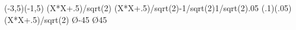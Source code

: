 \documentclass{jarticle}
\begin{document}
\begin{zahyou}[ul=10mm](-3,5)(-1,5)
  \zahyouMemori[g]%
  \def\Fx{(X*X+.5)/sqrt(2)}
  \YKinziOresen\Fx\xmin{}\oresen
  \YKinziOresen\Fx{-1/sqrt(2)}{1/sqrt(2)}{.05}\nurisen
  \edefappend{}
  \YGurafu(.1)(.05)\Fx\xmin\xmax
  \kTyokusen\O{-45}{}{}\Put{}
  \kTyokusen\O{45}{}{}\Put{}
  \begin{azahyou}\E\F
    \azTenretutoz\oresen\oresen
    \azTenretutoz\nurisen\nurisen
    \clipDrawline\oresen
    \Nuritubusi\nurisen
  \end{azahyou}
\end{zahyou}
\end{document}
